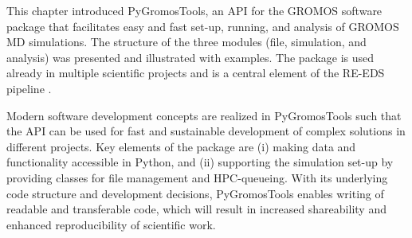 This chapter introduced PyGromosTools, an API for the GROMOS software package that facilitates easy and fast set-up, running, and analysis of GROMOS MD simulations. The structure of the three modules (file, simulation, and analysis) was presented and illustrated with examples.  
The package is used already in multiple scientific projects and is a central element of the RE-EDS pipeline \cite{Ries2021}. 

Modern software development concepts are realized in PyGromosTools such that the API can be used for fast and sustainable development of complex solutions in different projects. Key elements of the package are (i) making data and functionality accessible in Python, and (ii) supporting the simulation set-up by providing classes for file management and HPC-queueing. With its underlying code structure and development decisions, PyGromosTools enables writing of readable and transferable code, which will result in increased shareability and enhanced reproducibility of scientific work.  \cite{Walters2020}
